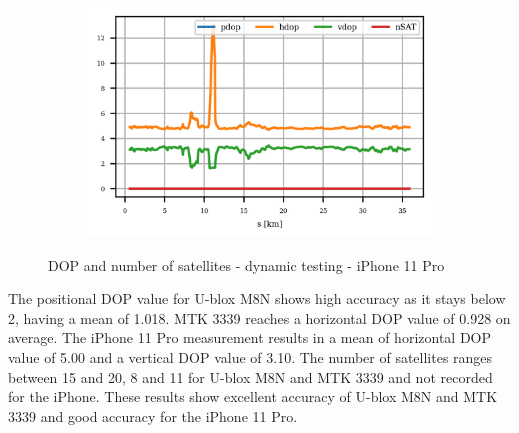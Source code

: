 \documentclass{article}
\begin{document}
			\begin{figure}[h]
		   		\centering
		     	\begin{subfigure}[b]{0.45\textwidth}
		      		\centering
		      	   \includegraphics[width=\textwidth]{Dynamic/cond_dop_IPhone 11 Pro.png}
		     	\end{subfigure}
				\caption{DOP and number of satellites - dynamic testing - iPhone 11 Pro}		     	
		      \label{fig:dyn_dop_iphone}
			\end{figure}
			The positional DOP value for U-blox M8N shows high accuracy as it stays below 2, having a mean of 1.018. MTK 3339 reaches a horizontal DOP value of 0.928 on average. The iPhone 11 Pro measurement results in a mean of horizontal DOP value of 5.00 and a vertical DOP value of 3.10. The number of satellites ranges between 15 and 20, 8 and 11 for U-blox M8N and MTK 3339 and not recorded for the iPhone. These results show excellent accuracy of U-blox M8N and MTK 3339 and good accuracy for the iPhone 11 Pro.
			
\end{document}
